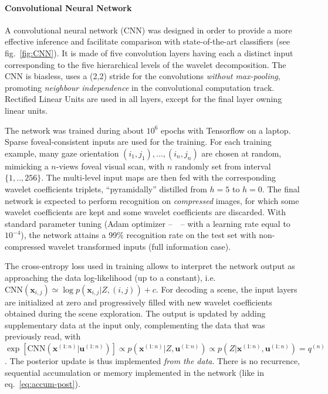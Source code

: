 \documentclass[12pt,twoside,openright]{article}
\begin{document}
\paragraph{Convolutional Neural Network}
A convolutional neural network (CNN) was designed in order to provide a more effective {\color{Purple} inference} and facilitate comparison with state-of-the-art classifiers (see fig.~\ref{fig:CNN}). 
It is made of five convolution layers having each a distinct input corresponding to the five hierarchical levels of the wavelet decomposition. 
The CNN is biasless, uses a (2,2) stride for the convolutions \emph{without max-pooling}, promoting \emph{neighbour independence} in the convolutional computation track.
Rectified Linear Units are used in all layers, except for the final layer owning linear units. 

The network was trained during about $10^6$ epochs with Tensorflow on a laptop.
{\color{Purple} Sparse foveal-consistent inputs are used for the training. For each training example, many gaze orientation $(i_1,j_1), ..., (i_n,j_n)$ are chosen at random, mimicking a $n$-views foveal visual scan, with $n$ randomly set from interval $\{1,..,256\}$. The multi-level input maps are then fed with the corresponding wavelet coefficients triplets, “pyramidally” distilled from $h = 5$ to $h = 0$.} {\color{Purple} The final network is expected to perform recognition on \emph{compressed} images, for which some wavelet coefficients are kept and some wavelet coefficients are discarded.} With standard parameter tuning { \color{Purple}(Adam optimizer --~\citet{kingma2014adam}~-- with a learning rate equal to $10^{-4}$)}, the network attains a 99\% recognition rate on the test set with non-{\color{Purple}compressed} wavelet transformed inputs {\color{Purple}(full information case)}. 


The cross-entropy loss used in training {\color{Purple} allows to interpret} the network output as {\color{Purple} approaching} the data log-likelihood {\color{Purple}(up to a constant), i.e. $\text{CNN}(\boldsymbol{x}_{i,j}) \simeq \log p(\boldsymbol{x}_{i,j}|Z,(i,j)) + c$}. For decoding a scene, the input layers are initialized at zero  and progressively filled with new wavelet coefficients {\color{Purple} obtained during the scene exploration}.
The output is updated by adding supplementary data at the input only, complementing the data that was previously read, {\color{Purple} with $\exp \left[\text{CNN}(\boldsymbol{x}^{(1:n)}|\boldsymbol{u}^{(1:n)})\right] \propto p(\boldsymbol{x}^{(1:n)}|Z,\boldsymbol{u}^{(1:n)}) \propto p(Z|\boldsymbol{x}^{(1:n)},\boldsymbol{u}^{(1:n)}) = q^{(n)}$.} The posterior update is thus implemented \emph{from the data}. There is no recurrence, sequential accumulation or memory implemented in the network (like in eq.~\ref{eq:accum-post}). 
\end{document}
